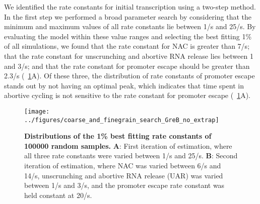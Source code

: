 %

We identified the rate constants for initial transcription using a two-step
method. In the first step we performed a broad parameter search by considering
that the minimum and maximum values of all rate constants lie between 1/s and
25/s. By evaluating the model within these value ranges and selecting the best
fitting 1\% of all simulations, we found that the rate constant for NAC is
greater than 7/s; that the rate constant for unscrunching and abortive RNA
release lies between 1 and 3/s; and that the rate constant for promoter escape
should be greater than 2.3/s (\FIG~\ref{fig:parameter_estimation_proper}A). Of
these three, the distribution of rate constants of promoter escape stands out
by not having an optimal peak, which indicates that time spent in abortive
cycling is not sensitive to the rate constant for promoter escape
(\FIG~\ref{fig:parameter_estimation_proper}A).

\begin{figure}[h]
    \begin{center}
      \texttt{[image: ../figures/coarse\_and\_finegrain\_search\_GreB\_no\_extrap]}
    \end{center}
  \caption{ {\bf Distributions of the 1\% best fitting rate
    constants of 100000 random samples.} \textbf{A}: First iteration of
    estimation, where all three rate constants were varied between 1/s and
    25/s. \textbf{B}: Second iteration of estimation, where NAC was varied
    between 6/s and 14/s, unscrunching and abortive RNA release (UAR)
    was varied between 1/s and 3/s, and the promoter escape rate constant was
    held constant at 20/s.}
    \label{fig:parameter_estimation_proper}
\end{figure}

